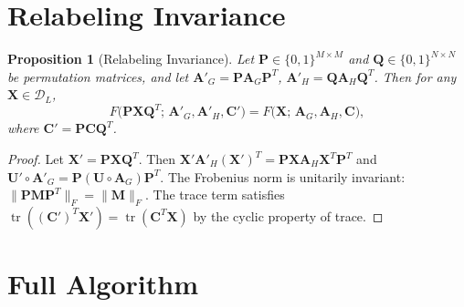 \documentclass[conference]{IEEEtran}
\newtheorem{proposition}{Proposition}
\begin{document}
\section{Relabeling Invariance}
\label{sec:invariance}

\begin{proposition}[Relabeling Invariance]
\label{prop:invariance}
Let $\mathbf{P} \!\in\! \{0,1\}^{M \times M}$ and
$\mathbf{Q} \!\in\! \{0,1\}^{N \times N}$ be permutation
matrices, and let
$\mathbf{A}'_G = \mathbf{P}\mathbf{A}_G\mathbf{P}^T$,
$\mathbf{A}'_H = \mathbf{Q}\mathbf{A}_H\mathbf{Q}^T$.
Then for any $\mathbf{X} \!\in\! \mathcal{D}_L$,
\begin{equation}
F\!\bigl(\mathbf{P}\mathbf{X}\mathbf{Q}^T;\,
  \mathbf{A}'_G, \mathbf{A}'_H, \mathbf{C}'\bigr)
= F\!\bigl(\mathbf{X};\,
  \mathbf{A}_G, \mathbf{A}_H, \mathbf{C}\bigr),
\label{eq:invariance}
\end{equation}
where $\mathbf{C}' = \mathbf{P}\mathbf{C}\mathbf{Q}^T$.
\end{proposition}

\begin{proof}
Let $\mathbf{X}' = \mathbf{P}\mathbf{X}\mathbf{Q}^T$.
Then $\mathbf{X}'\mathbf{A}'_H(\mathbf{X}')^T
= \mathbf{P}\mathbf{X}\mathbf{A}_H\mathbf{X}^T\mathbf{P}^T$
and $\mathbf{U}' \circ \mathbf{A}'_G
= \mathbf{P}(\mathbf{U}\!\circ\!\mathbf{A}_G)\mathbf{P}^T$.
The Frobenius norm is unitarily invariant:
$\|\mathbf{P}\mathbf{M}\mathbf{P}^T\|_F = \|\mathbf{M}\|_F$.
The trace term satisfies
$\operatorname{tr}((\mathbf{C}')^T\mathbf{X}')
= \operatorname{tr}(\mathbf{C}^T\mathbf{X})$
by the cyclic property of trace.
\end{proof}


\section{Full Algorithm}
\label{sec:algorithm}
\end{document}
